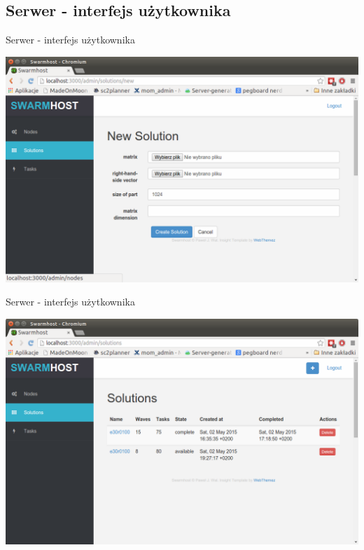 \documentclass[12pt]{beamer}
\begin{document}
\subsection{Serwer - interfejs użytkownika}
\begin{frame}{Serwer - interfejs użytkownika}
\begin{center}
	\includegraphics[scale=0.3]{swarmhost}
\end{center}
\end{frame}

\begin{frame}{Serwer - interfejs użytkownika}
\begin{center}
	\includegraphics[scale=0.3]{swarmhost2}
\end{center}
\end{frame}
\end{document}
